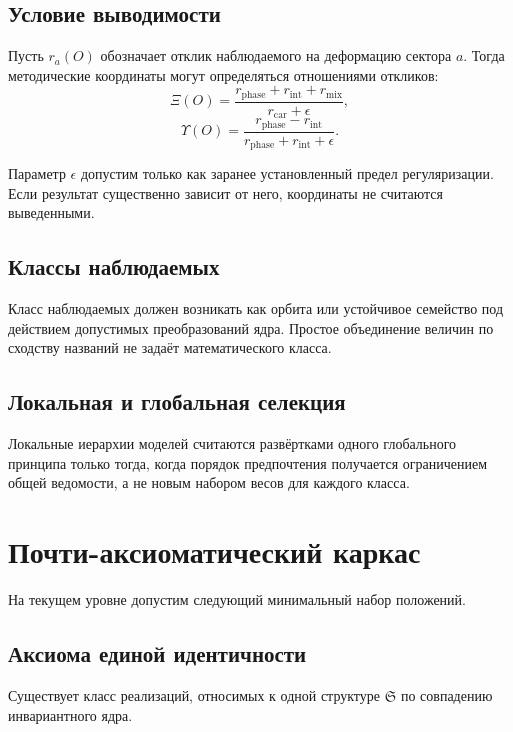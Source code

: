 \section{Условие выводимости}

Пусть $r_a(O)$ обозначает отклик наблюдаемого на деформацию сектора $a$.
Тогда методические координаты могут определяться отношениями откликов:
\begin{equation}
 \Xi(O)=\frac{r_{\mathrm{phase}}+r_{\mathrm{int}}+r_{\mathrm{mix}}}
 {r_{\mathrm{car}}+\epsilon},
\end{equation}
\begin{equation}
 \Upsilon(O)=
 \frac{r_{\mathrm{phase}}-r_{\mathrm{int}}}
 {r_{\mathrm{phase}}+r_{\mathrm{int}}+\epsilon}.
\end{equation}

Параметр $\epsilon$ допустим только как заранее установленный предел
регуляризации. Если результат существенно зависит от него, координаты не
считаются выведенными.

\section{Классы наблюдаемых}

Класс наблюдаемых должен возникать как орбита или устойчивое семейство под
действием допустимых преобразований ядра. Простое объединение величин по
сходству названий не задаёт математического класса.

\section{Локальная и глобальная селекция}

Локальные иерархии моделей считаются развёртками одного глобального принципа
только тогда, когда порядок предпочтения получается ограничением общей
ведомости, а не новым набором весов для каждого класса.

\chapter{Почти-аксиоматический каркас}

На текущем уровне допустим следующий минимальный набор положений.

\section{Аксиома единой идентичности}

Существует класс реализаций, относимых к одной структуре $\mathfrak S$ по
совпадению инвариантного ядра.

